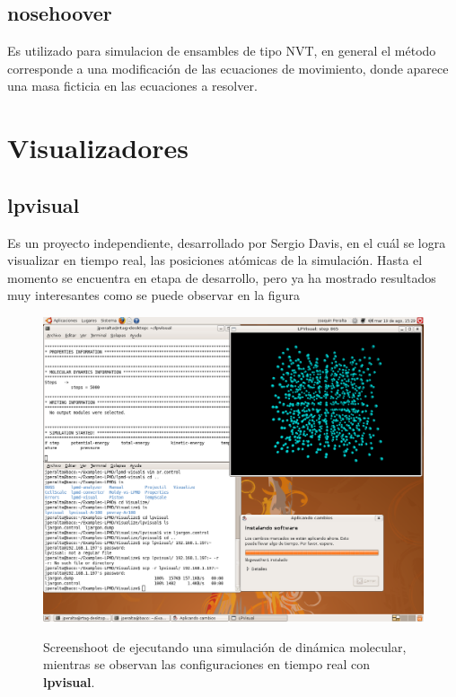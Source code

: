 \subsection{nosehoover}
Es utilizado para simulacion de ensambles de tipo NVT, en general el m\'etodo corresponde a una modificaci\'on de las ecuaciones de movimiento, donde aparece una masa ficticia en las ecuaciones a resolver.

\section{Visualizadores}
\subsection{lpvisual}
Es un proyecto independiente, desarrollado por Sergio Davis, en el cu\'al se logra visualizar en tiempo real, las posiciones at\'omicas de la simulaci\'on. Hasta el momento se encuentra en etapa de desarrollo, pero ya ha mostrado resultados muy interesantes como se puede observar en la figura

\begin{figure}[h!]
 \centering
 \includegraphics[scale=.25]{lpvisual.png}
 \label{fig:lpvisual}
 \caption{Screenshoot de {\lpmd} ejecutando una simulaci\'on de din\'amica molecular, mientras se observan las configuraciones en tiempo real con \textbf{lpvisual}.}
\end{figure}

